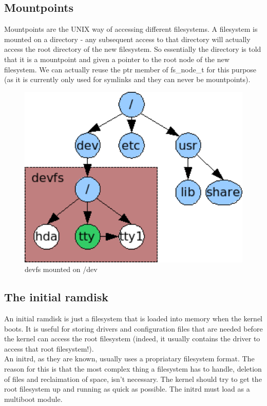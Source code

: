 \documentclass[12pt]{article}
\begin{document}
\subsection{Mountpoints}
Mountpoints are the UNIX way of accessing different filesystems. A filesystem is mounted on a directory - any subsequent access to that directory will actually access the root directory of the new filesystem. So essentially the directory is told that it is a mountpoint and given a pointer to the root node of the new filesystem. We can actually reuse the ptr member of fs\_node\_t for this purpose (as it is currently only used for symlinks and they can never be mountpoints).
\begin{figure}[H]
  \centering
  \includegraphics[width=12cm]{images/mount.png}
  \caption{devfs mounted on /dev}
\end{figure}

\subsection{The initial ramdisk}
An initial ramdisk is just a filesystem that is loaded into memory when the kernel boots. It is useful for storing drivers and configuration files that are needed before the kernel can access the root filesystem (indeed, it usually contains the driver to access that root filesystem!).\\
An initrd, as they are known, usually uses a propriatary filesystem format. The reason for this is that the most complex thing a filesystem has to handle, deletion of files and reclaimation of space, isn't necessary. The kernel should try to get the root filesystem up and running as quick as possible.
The initrd must load as a multiboot module.
\end{document}
